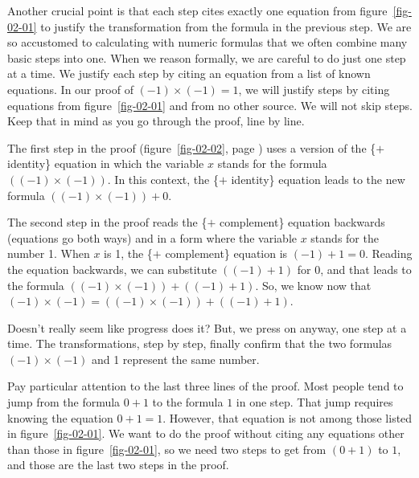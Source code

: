 Another crucial point is that each step cites
exactly one equation from figure~\ref{fig-02-01}
to justify the transformation from the formula in the previous step.
We are so accustomed to calculating with numeric formulas that
we often combine many basic steps into one. When we reason formally,
we are careful to do just one step at a time.
We justify each step by citing an equation
from a list of known equations. In our proof of $(-1)\times(-1) = 1$,
we will justify steps by citing equations from figure~\ref{fig-02-01}
and from no other source. We will not skip steps.
Keep that in mind as you go through the proof, line by line.

The first step in the proof
(figure~\ref{fig-02-02}, page \pageref{fig-02-02}) uses a version of the
\{$+$ identity\} equation in which the variable $x$ stands for the
formula $((-1)\times(-1))$.
In this context, the \{$+$ identity\} equation
leads to the new formula $((-1)\times(-1)) + 0$.

The second step in the proof reads the \{$+$ complement\}
equation backwards (equations go both ways) and in a form
where the variable $x$ stands for the number 1.
When $x$ is 1, the \{$+$ complement\} equation is
$(-1) + 1 = 0$.
Reading the equation backwards, we can substitute
$((-1) + 1)$ for $0$,
and that leads to the formula $((-1)\times(-1)) + ((-1) + 1)$.
So, we know now that
$(-1)\times(-1) = ((-1)\times(-1)) + ((-1) + 1)$.

Doesn't really seem like progress does it?
But, we press on anyway, one step at a time.
The transformations, step by step, finally confirm that the two formulas
$(-1)\times(-1)$ and 1 represent the same number.

Pay particular attention to the last three lines of the proof.
Most people tend to jump from the formula $0+1$ to the
formula $1$ in one step. That jump requires knowing the equation
$0+1 = 1$. However, that equation is not among those listed in
figure~\ref{fig-02-01}.
We want to do the proof without citing any equations
other than those in figure~\ref{fig-02-01}, so we need two steps
to get from $(0+1)$ to $1$,
and those are the last two steps in the proof.

